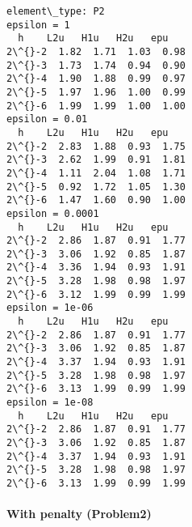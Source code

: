 \documentclass[11pt]{article}
\begin{document}
    \begin{Verbatim}[commandchars=\\\{\}]
element\_type: P2
epsilon = 1
  h    L2u   H1u   H2u   epu
2\^{}-2  1.82  1.71  1.03  0.98
2\^{}-3  1.73  1.74  0.94  0.90
2\^{}-4  1.90  1.88  0.99  0.97
2\^{}-5  1.97  1.96  1.00  0.99
2\^{}-6  1.99  1.99  1.00  1.00
epsilon = 0.01
  h    L2u   H1u   H2u   epu
2\^{}-2  2.83  1.88  0.93  1.75
2\^{}-3  2.62  1.99  0.91  1.81
2\^{}-4  1.11  2.04  1.08  1.71
2\^{}-5  0.92  1.72  1.05  1.30
2\^{}-6  1.47  1.60  0.90  1.00
epsilon = 0.0001
  h    L2u   H1u   H2u   epu
2\^{}-2  2.86  1.87  0.91  1.77
2\^{}-3  3.06  1.92  0.85  1.87
2\^{}-4  3.36  1.94  0.93  1.91
2\^{}-5  3.28  1.98  0.98  1.97
2\^{}-6  3.12  1.99  0.99  1.99
epsilon = 1e-06
  h    L2u   H1u   H2u   epu
2\^{}-2  2.86  1.87  0.91  1.77
2\^{}-3  3.06  1.92  0.85  1.87
2\^{}-4  3.37  1.94  0.93  1.91
2\^{}-5  3.28  1.98  0.98  1.97
2\^{}-6  3.13  1.99  0.99  1.99
epsilon = 1e-08
  h    L2u   H1u   H2u   epu
2\^{}-2  2.86  1.87  0.91  1.77
2\^{}-3  3.06  1.92  0.85  1.87
2\^{}-4  3.37  1.94  0.93  1.91
2\^{}-5  3.28  1.98  0.98  1.97
2\^{}-6  3.13  1.99  0.99  1.99
    \end{Verbatim}

    \paragraph{With penalty (Problem2)}\label{with-penalty-problem2}
\end{document}
